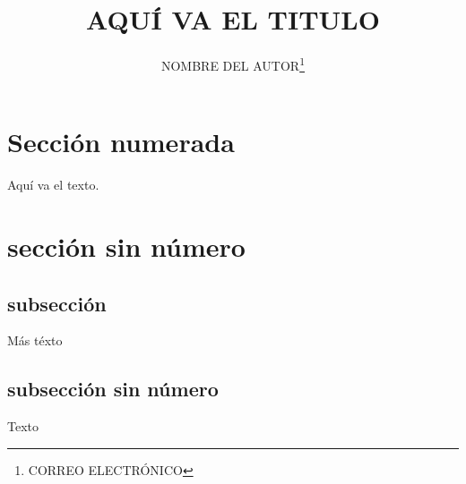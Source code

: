\documentclass[12pt,letterpaper]{article}
\title{\textsc{AQUÍ VA EL TITULO}}
\author{NOMBRE DEL AUTOR\thanks{CORREO ELECTRÓNICO}}
\affil{AFILIACIÓN}
\date{}
\begin{document}
\maketitle
\tableofcontents
\section{Sección numerada}
Aquí va el texto.
\section*{sección sin número}
\subsection{subsección}
Más téxto
\subsection*{subsección sin número}
Texto
\end{document}
